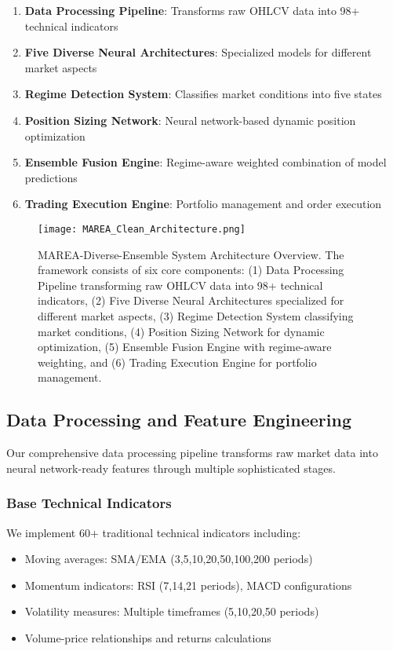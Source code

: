 \documentclass[10pt,twocolumn]{article}
\begin{document}
\begin{enumerate}[itemsep=1pt]
\item \textbf{Data Processing Pipeline}: Transforms raw OHLCV data into 98+ technical indicators
\item \textbf{Five Diverse Neural Architectures}: Specialized models for different market aspects
\item \textbf{Regime Detection System}: Classifies market conditions into five states
\item \textbf{Position Sizing Network}: Neural network-based dynamic position optimization
\item \textbf{Ensemble Fusion Engine}: Regime-aware weighted combination of model predictions
\item \textbf{Trading Execution Engine}: Portfolio management and order execution
\end{enumerate}

\begin{figure*}[!htb]
\centering
\vspace{0.2cm}
\texttt{[image: MAREA\_Clean\_Architecture.png]}
\vspace{0.1cm}
\caption{MAREA-Diverse-Ensemble System Architecture Overview. The framework consists of six core components: (1) Data Processing Pipeline transforming raw OHLCV data into 98+ technical indicators, (2) Five Diverse Neural Architectures specialized for different market aspects, (3) Regime Detection System classifying market conditions, (4) Position Sizing Network for dynamic optimization, (5) Ensemble Fusion Engine with regime-aware weighting, and (6) Trading Execution Engine for portfolio management.}
\label{fig:system_architecture}
\vspace{0.2cm}
\end{figure*}

\subsection{Data Processing and Feature Engineering}

Our comprehensive data processing pipeline transforms raw market data into neural network-ready features through multiple sophisticated stages.

\subsubsection{Base Technical Indicators}

We implement 60+ traditional technical indicators including:
\begin{itemize}[itemsep=1pt]
\item Moving averages: SMA/EMA (3,5,10,20,50,100,200 periods)
\item Momentum indicators: RSI (7,14,21 periods), MACD configurations
\item Volatility measures: Multiple timeframes (5,10,20,50 periods)
\item Volume-price relationships and returns calculations
\end{itemize}
\end{document}
